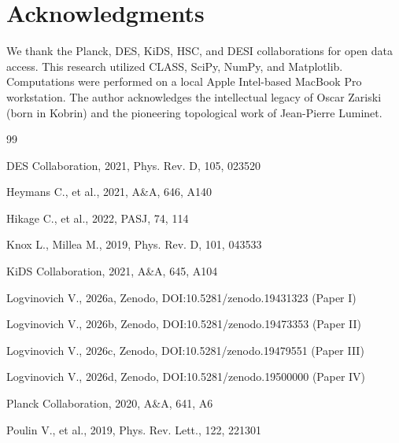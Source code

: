 \documentclass[12pt,a4paper]{article}
\begin{document}
\section*{Acknowledgments}

We thank the Planck, DES, KiDS, HSC, and DESI collaborations for open data access. This research utilized CLASS, SciPy, NumPy, and Matplotlib. Computations were performed on a local Apple Intel-based MacBook Pro workstation. The author acknowledges the intellectual legacy of Oscar Zariski (born in Kobrin) and the pioneering topological work of Jean-Pierre Luminet.

\begin{thebibliography}{99}

DES Collaboration, 2021, Phys. Rev. D, 105, 023520

Heymans C., et al., 2021, A\&A, 646, A140

Hikage C., et al., 2022, PASJ, 74, 114

Knox L., Millea M., 2019, Phys. Rev. D, 101, 043533

KiDS Collaboration, 2021, A\&A, 645, A104

Logvinovich V., 2026a, Zenodo, DOI:10.5281/zenodo.19431323 (Paper I)

Logvinovich V., 2026b, Zenodo, DOI:10.5281/zenodo.19473353 (Paper II)

Logvinovich V., 2026c, Zenodo, DOI:10.5281/zenodo.19479551 (Paper III)

Logvinovich V., 2026d, Zenodo, DOI:10.5281/zenodo.19500000 (Paper IV)

Planck Collaboration, 2020, A\&A, 641, A6

Poulin V., et al., 2019, Phys. Rev. Lett., 122, 221301

\end{thebibliography}
\end{document}
